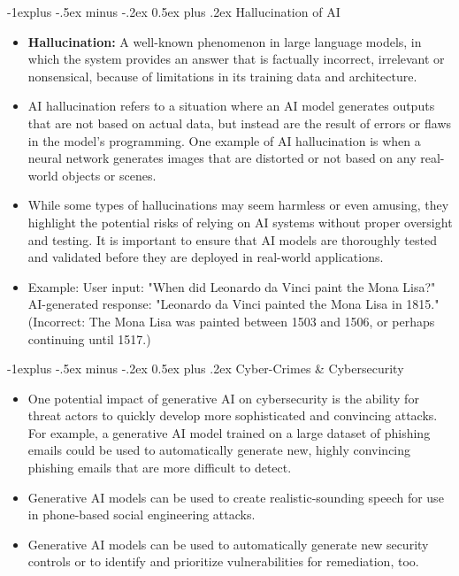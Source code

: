 \documentclass[12pt, landscape]{article}
\makeatletter
\renewcommand{\subsection}{\@startsection{subsection}{2}{0mm}%
                                {-1explus -.5ex minus -.2ex}%
                                {0.5ex plus .2ex}%
                                {\normalfont\normalsize\bfseries}}
\makeatother
\begin{document}
\begin{multicols*}{3}
\subsection{Hallucination of AI}
\begin{itemize}
\item \textbf{Hallucination:} A well-known phenomenon in large language models, in which the system provides an answer that is factually incorrect, irrelevant or nonsensical, because of limitations in its training data and architecture.
\item AI hallucination refers to a situation where an AI model generates outputs that are not based on actual data, but instead are the result of errors or flaws in the model's programming. One example of AI hallucination is when a neural network generates images that are distorted or not based on any real-world objects or scenes.
\item While some types of hallucinations may seem harmless or even amusing, they highlight the potential risks of relying on AI systems without proper oversight and testing. It is important to ensure that AI models are thoroughly tested and validated before they are deployed in real-world applications.
\item Example: User input: "When did Leonardo da Vinci paint the Mona Lisa?" AI-generated response: "Leonardo da Vinci painted the Mona Lisa in 1815." (Incorrect: The Mona Lisa was painted between 1503 and 1506, or perhaps continuing until 1517.)
\end{itemize}


\subsection{Cyber-Crimes \& Cybersecurity}
\begin{itemize}
\item One potential impact of generative AI on cybersecurity is the ability for threat actors to quickly develop more sophisticated and convincing attacks. For example, a generative AI model trained on a large dataset of phishing emails could be used to automatically generate new, highly convincing phishing emails that are more difficult to detect.
\item Generative AI models can be used to create realistic-sounding speech for use in phone-based social engineering attacks.
\item Generative AI models can be used to automatically generate new security controls or to identify and prioritize vulnerabilities for remediation, too.
\end{itemize}


\end{multicols*}
\end{document}
